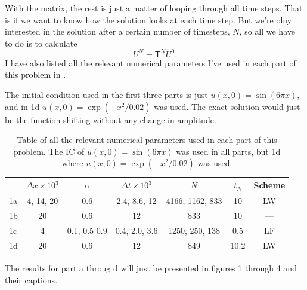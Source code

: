 \documentclass[11pt,letter, swedish, english
]{article}
\newcommand{\Dx}{\ensuremath{\Delta{x}}}
\newcommand{\Dt}{\ensuremath{\Delta{t}}}
\begin{document}
With the matrix, the rest is just a matter of looping through all time
steps. That is if we want to know how the solution looks at each time
step. But we're olny interested in the solution after a certain number
of timesteps, $N$, so all we have to do is to calculate
\begin{equation}
U^{N}=\mathsf{T}^NU^{0}.
\end{equation}
I have also listed all the relevant numerical parameters I've used in
each part of this problem in .

The initial condition used in the first three parts is just $u(x,
0)=\sin(6\pi x)$, and in 1d $u(x, 0)=\exp(-x^2/0.02)$ was used. The
exact solution would just be the function shifting without any change
in amplitude. 

\begin{table}\centering
\caption{Table of all the relevant numerical parameters used in each
  part of this problem. The IC of $u(x, 0)=\sin(6\pi x)$ was used in
  all parts, but 1d where $u(x, 0)=\exp(-x^2/0.02)$ was used. }
\label{tab:1_num_par}
\begin{tabular}{l|c|c|c|c|c|c|}\cline{2-7}
& $\Dx\times10^3$ & $\alpha$ 
& $\Dt\times10^3$ & $N$& $t_N$ & Scheme
\\ \hline
\multicolumn{1}{|l|}{1a} 
& 4, 14, 20 & 0.6 & 2.4, 8.6, 12 
& 4166, 1162, 833 & 10 & LW
\\ \hline
\multicolumn{1}{|l|}{1b} 
& 20 & 0.6 & 12 & 833 & 10 & ---
\\ \hline 
\multicolumn{1}{|l|}{1c} 
& 4 & 0.1, 0.5 0.9 & 0.4, 2.0, 3.6
& 1250, 250, 138 & 0.5 & LF
\\ \hline
\multicolumn{1}{|l|}{1d} 
& 20 & 0.6 & 12 
& 849 & 10.2 & LW
\\ \hline
\end{tabular}
\end{table}

The results for part a throug d will just be presented in figures 1
through 4 and their captions.
\end{document}
